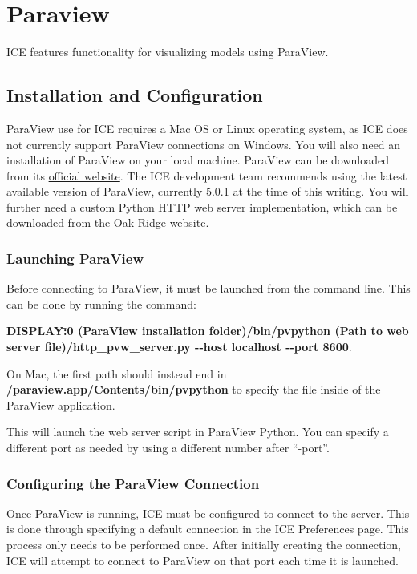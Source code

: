 \chapter{Paraview}

ICE features functionality for visualizing models using ParaView.

\section{Installation and Configuration}

ParaView use for ICE requires a Mac OS or Linux operating system, as ICE does
not currently support ParaView connections on Windows. You will also need an
installation of ParaView on your local machine. ParaView can be downloaded from
its \href{http://www.paraview.org/download/}{official website}. The ICE
development team recommends using the latest available version of ParaView,
currently 5.0.1 at the time of this writing. You will further need a custom
Python HTTP web server implementation, which can be downloaded from the
\href{http://eclipseice.ornl.gov/downloads/paraview/scripts/http_pvw_server.py}{Oak
Ridge website}.

\subsection{Launching ParaView}  

Before connecting to ParaView, it must be launched from the command line. This
can be done by running the command:

\textbf{DISPLAY\=:0 (ParaView installation folder)/bin/pvpython (Path to web
server file)/http\_pvw\_server.py -{}-host localhost -{}-port 8600}.

On Mac, the first path should instead end in \newline
\textbf{/paraview.app/Contents/bin/pvpython} to specify the file inside of the
ParaView application.

This will launch the web server script in ParaView Python. You can specify a
different port as needed by using a different number after ``-port''.

\subsection{Configuring the ParaView Connection}

Once ParaView is running, ICE must be configured to connect to the server. This
is done through specifying a default connection in the ICE Preferences page.
This process only needs to be performed once. After initially creating the
connection, ICE will attempt to connect to ParaView on that port each time it is
launched.

